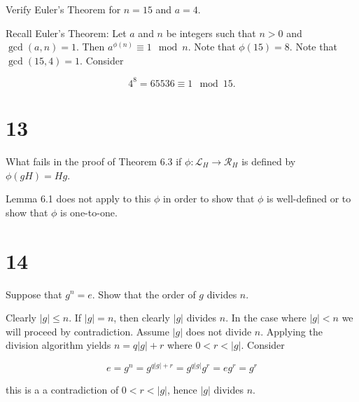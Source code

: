 \documentclass[a4paper]{article}
\begin{document}
Verify Euler's Theorem for $n=15$ and $a=4$.

\vspace{\baselineskip}

Recall Euler's Theorem: Let $a$ and $n$ be integers such that $n > 0$ and $\gcd(a,n) = 1$. Then $a^{\phi(n)} \equiv 1 \mod n$. Note that $\phi(15) = 8$. Note that $\gcd(15, 4) = 1$. Consider

$$4^8 = 65536 \equiv 1 \mod 15.$$


\section*{13}

What fails in the proof of Theorem 6.3 if $\phi : \mathcal{L}_H \rightarrow \mathcal{R}_H$ is defined by $\phi(gH) = Hg$.

\vspace{\baselineskip}

Lemma 6.1 does not apply to this $\phi$ in order to show that $\phi$ is well-defined or to show that $\phi$ is one-to-one.


\section*{14}

Suppose that $g^n = e$. Show that the order of $g$ divides $n$.

\vspace{\baselineskip}

Clearly $|g| \leq n$. If $|g| = n$, then clearly $|g|$ divides $n$. In the case where $|g| < n$ we will proceed by contradiction. Assume $|g|$ does not divide $n$. Applying the division algorithm yields $n = q|g| + r$ where $0 < r < |g|$. Consider

$$e = g^n = g^{q|g| + r} = g^{q|g|}g^r = eg^r = g^r$$

this is a a contradiction of $0 < r < |g|$, hence $|g|$ divides $n$.
\end{document}
